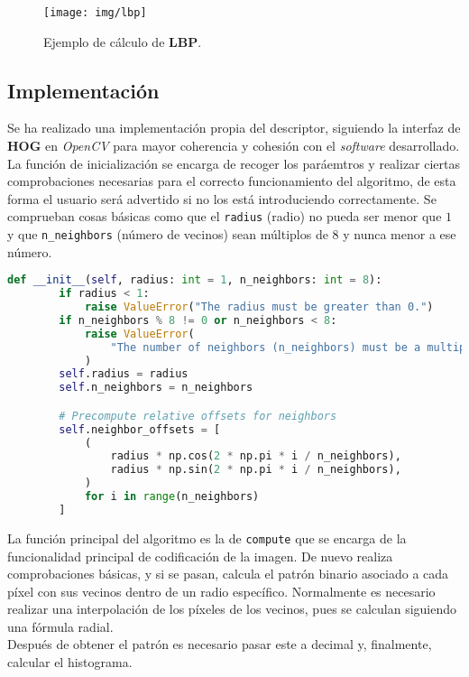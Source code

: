 \documentclass[12pt,letterpaper]{article}
\begin{document}
\begin{figure}[htp]
    \centering
    \texttt{[image: img/lbp]}
    \caption{Ejemplo de cálculo de \textbf{LBP}.}
    \label{fig:lbp}
\end{figure}

\subsection{Implementación}
Se ha realizado una implementación propia del descriptor, siguiendo la interfaz de \textbf{HOG} en \textit{OpenCV} para mayor coherencia y cohesión con el \textit{software} desarrollado.\\[6pt]
La función de inicialización se encarga de recoger los paráemtros y realizar ciertas comprobaciones necesarias para el correcto funcionamiento del algoritmo, de esta forma el usuario será advertido si no los está introduciendo correctamente. Se comprueban cosas básicas como que el \texttt{radius} (radio) no pueda ser menor que $1$ y que \texttt{n\_neighbors} (número de vecinos) sean múltiplos de $8$ y nunca menor a ese número.

\begin{lstlisting}[language=python]
    def __init__(self, radius: int = 1, n_neighbors: int = 8):
        if radius < 1:
            raise ValueError("The radius must be greater than 0.")
        if n_neighbors % 8 != 0 or n_neighbors < 8:
            raise ValueError(
                "The number of neighbors (n_neighbors) must be a multiple of 8 and at least 8."
            )
        self.radius = radius
        self.n_neighbors = n_neighbors

        # Precompute relative offsets for neighbors
        self.neighbor_offsets = [
            (
                radius * np.cos(2 * np.pi * i / n_neighbors),
                radius * np.sin(2 * np.pi * i / n_neighbors),
            )
            for i in range(n_neighbors)
        ]
\end{lstlisting}

La función principal del algoritmo es la de \texttt{compute} que se encarga de la funcionalidad principal de codificación de la imagen. De nuevo realiza comprobaciones básicas, y si se pasan, calcula el patrón binario asociado a cada píxel con sus vecinos dentro de un radio específico. Normalmente es necesario realizar una interpolación de los píxeles de los vecinos, pues se calculan siguiendo una fórmula radial.\\[6pt]
Después de obtener el patrón es necesario pasar este a decimal y, finalmente, calcular el histograma.
\end{document}
